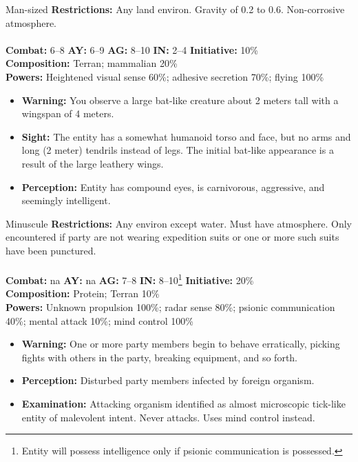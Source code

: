\hrulefill

\begin{creature}{Man-sized}
\textbf{Restrictions:} Any land environ. Gravity of 0.2 to 0.6. Non-corrosive atmosphere. \\\\
\textbf{Combat:} 6--8 \textbf{AY:} 6--9 \textbf{AG:} 8--10 \textbf{IN:} 2--4 \textbf{Initiative:} 10\% \\
\textbf{Composition:} Terran; mammalian 20\% \\
\textbf{Powers:} Heightened visual sense 60\%; adhesive secretion 70\%; flying 100\% 
\begin{itemize}
\item \textbf{Warning:} You observe a large bat-like creature about 2 meters tall with a wingspan of 4 meters. 
\item \textbf{Sight:} The entity has a somewhat humanoid torso and face, but no arms and long (2 meter) tendrils instead of legs. The initial bat-like 
appearance is a result of the large leathery wings. 
\item \textbf{Perception:} Entity has compound eyes, is carnivorous, aggressive, and seemingly intelligent. 
\end{itemize}
\end{creature}

\hrulefill

\begin{creature}{Minuscule}
\textbf{Restrictions:} Any environ except water. Must have atmosphere. Only encountered if party are not wearing expedition suits or one or 
more such suits have been punctured. \\\\
\textbf{Combat:} na \textbf{AY:} na \textbf{AG:} 7--8 \textbf{IN:} 8--10\footnote{Entity will possess intelligence only if psionic communication is possessed.} \textbf{Initiative:} 20\% \\
\textbf{Composition:} Protein; Terran 10\% \\
\textbf{Powers:} Unknown propulsion 100\%; radar sense 80\%; psionic communication 40\%; mental attack 10\%; mind control 100\% 
\begin{itemize}
\item \textbf{Warning:} One or more party members begin to behave erratically, picking fights with others in the party, breaking equipment, and so 
forth. 
\item \textbf{Perception:} Disturbed party members infected by foreign organism. 
\item \textbf{Examination:} Attacking organism identified as almost microscopic tick-like entity of malevolent intent. Never attacks. Uses mind 
control instead. 
\end{itemize}
\end{creature}

